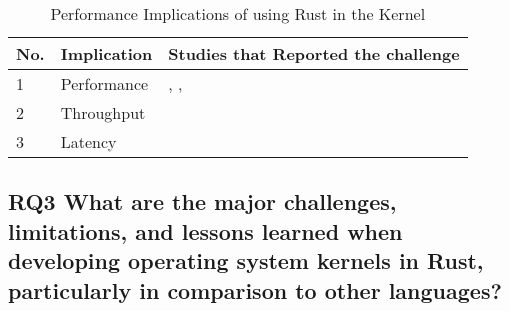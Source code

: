 \documentclass[sigconf]{acmart}
\begin{document}
\begin{table}
    \begin{tabular}{||l|l|l||}
    \hline
    No. & Implication & Studies that Reported the challenge\\
    \hline\hline
    1 & Performance & \cite{Gonzalez2023-ek}, \cite{Li2024-be}, \cite{Ma2023-ef}\\
    2 & Throughput & \cite{Gonzalez2023-ek}\\
    3 & Latency & \cite{Culic2022-bk} \\
    \hline
  \end{tabular}
  \caption{Performance Implications of using Rust in the Kernel}
    \label{tab:RQ2}
\end{table}

\subsection{RQ3 What are the major challenges, limitations, and lessons learned when
      developing operating system kernels in Rust, particularly in comparison to other languages?}
\end{document}
